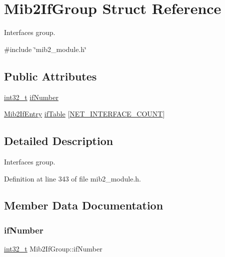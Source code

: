 \hypertarget{structMib2IfGroup}{}\section{Mib2\+If\+Group Struct Reference}
\label{structMib2IfGroup}


Interfaces group.  




{\ttfamily \#include \char`\"{}mib2\+\_\+module.\+h\char`\"{}}

\subsection*{Public Attributes}
\begin{DoxyCompactItemize}
\item 
\hyperlink{stdint_8h_ab1967d8591af1a4e48c37fd2b0f184d0}{int32\+\_\+t} \hyperlink{structMib2IfGroup_a838e343e16446835aa95a7ba7ccaa3d4}{if\+Number}
\item 
\hyperlink{structMib2IfEntry}{Mib2\+If\+Entry} \hyperlink{structMib2IfGroup_a2571ddd0d5455c9de70e465ae8f34369}{if\+Table} \mbox{[}\hyperlink{net__config_8h_a116f850ebcb023ffa3e6b8de10c5cb35}{N\+E\+T\+\_\+\+I\+N\+T\+E\+R\+F\+A\+C\+E\+\_\+\+C\+O\+U\+NT}\mbox{]}
\end{DoxyCompactItemize}


\subsection{Detailed Description}
Interfaces group. 

Definition at line 343 of file mib2\+\_\+module.\+h.



\subsection{Member Data Documentation}
\mbox{\label{structMib2IfGroup_a838e343e16446835aa95a7ba7ccaa3d4}} 
\subsubsection{\texorpdfstring{if\+Number}{ifNumber}}
{\footnotesize\ttfamily \hyperlink{stdint_8h_ab1967d8591af1a4e48c37fd2b0f184d0}{int32\+\_\+t} Mib2\+If\+Group\+::if\+Number}



